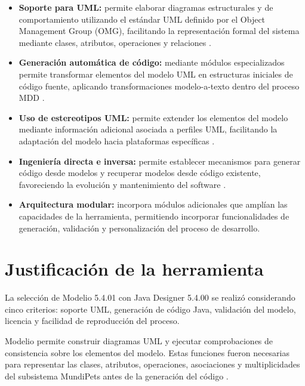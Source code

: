 \documentclass[10pt,a4paper,openany]{report}
\begin{document}
	\begin{itemize}
		
		\item \textbf{Soporte para UML:} permite elaborar diagramas estructurales y de 
		comportamiento utilizando el estándar UML definido por el Object Management 
		Group (OMG), facilitando la representación formal del sistema mediante clases,
		atributos, operaciones y relaciones \cite{omguml2017}.
		
		\item \textbf{Generación automática de código:} mediante módulos especializados 
		permite transformar elementos del modelo UML en estructuras iniciales de código 
		fuente, aplicando transformaciones modelo-a-texto dentro del proceso MDD 
		\cite{omgmof2008}.
		
		\item \textbf{Uso de estereotipos UML:} permite extender los elementos del 
		modelo mediante información adicional asociada a perfiles UML, facilitando la 
		adaptación del modelo hacia plataformas específicas 
		\cite{omguml2017}.
		
		\item \textbf{Ingeniería directa e inversa:} permite establecer mecanismos para 
		generar código desde modelos y recuperar modelos desde código existente, 
		favoreciendo la evolución y mantenimiento del software 
		\cite{brambilla2017}.
		
		\item \textbf{Arquitectura modular:} incorpora módulos adicionales que amplían 
		las capacidades de la herramienta, permitiendo incorporar funcionalidades de 
		generación, validación y personalización del proceso de desarrollo.
		
	\end{itemize}
	
	\section{Justificación de la herramienta}
	
	La selección de Modelio 5.4.01 con Java Designer 5.4.00 se realizó
	considerando cinco criterios: soporte UML, generación de código Java,
	validación del modelo, licencia y facilidad de reproducción del proceso.
	
	Modelio permite construir diagramas UML y ejecutar comprobaciones de
	consistencia sobre los elementos del modelo. Estas funciones fueron
	necesarias para representar las clases, atributos, operaciones,
	asociaciones y multiplicidades del subsistema MundiPets antes de la
	generación del código
	\cite{modelioOficial}.
	
\end{document}
